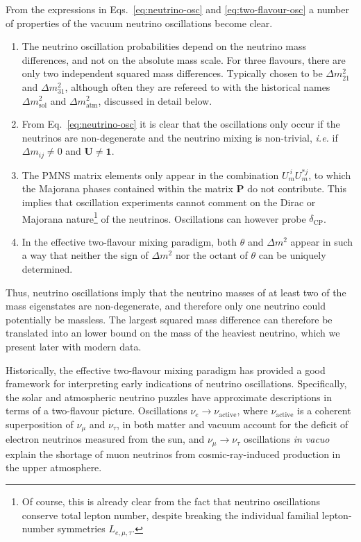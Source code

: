 From the expressions in Eqs.~\eqref{eq:neutrino-osc} and
\eqref{eq:two-flavour-osc} a number of properties of the vacuum neutrino
oscillations become clear.
\begin{enumerate}
  \item The neutrino oscillation probabilities depend on the neutrino mass
    differences, and not on the absolute mass scale. For three flavours, there
    are only two independent squared mass differences. Typically chosen to be
    $\Delta m_{21}^{2}$ and $\Delta m_{31}^{2}$, although often they are
    refereed to with the historical names $\Delta m_{\text{sol}}^{2}$ and
    $\Delta m_{\text{atm}}^{2}$, discussed in detail below.
  \item From Eq.~\eqref{eq:neutrino-osc} it is clear that the oscillations only
    occur if the neutrinos are non-degenerate and the neutrino mixing is
    non-trivial, \textit{i.e.} if $\Delta m_{ij} \neq 0$ and
    $\mathbf{U} \neq \mathbf{1}$.
  \item The PMNS matrix elements only appear in the combination
    $U_{m}^{\ i} U_{m}^{* j}$, to which the Majorana phases contained within the
    matrix $\mathbf{P}$ do not contribute. This implies that oscillation
    experiments cannot comment on the Dirac or Majorana nature\footnote{Of
    course, this is already clear from the fact that neutrino oscillations
    conserve total lepton number, despite breaking the individual familial
    lepton-number symmetries $L_{e, \mu, \tau}$.} of the neutrinos. Oscillations
    can however probe $\delta_{\text{CP}}$.
  \item In the effective two-flavour mixing paradigm, both $\theta$ and
    $\Delta m^{2}$ appear in such a way that neither the sign of $\Delta m^{2}$
    nor the octant of $\theta$ can be uniquely determined.
  \end{enumerate}
  Thus, neutrino oscillations imply that the neutrino masses of at least two of
  the mass eigenstates are non-degenerate, and therefore only one neutrino could
  potentially be massless. The largest squared mass difference can therefore be
  translated into an lower bound on the mass of the heaviest neutrino, which we
  present later with modern data.

  Historically, the effective two-flavour mixing paradigm has provided a good
  framework for interpreting early indications of neutrino oscillations.
  Specifically, the solar and atmospheric neutrino puzzles have approximate
  descriptions in terms of a two-flavour picture. Oscillations
  $\nu_{e} \to \nu_{\text{active}}$, where $\nu_{\text{active}}$ is a coherent
  superposition of $\nu_{\mu}$ and $\nu_{\tau}$, in both matter and vacuum
  account for the deficit of electron neutrinos measured from the sun, and
  $\nu_{\mu} \to \nu_{\tau}$ oscillations \textit{in vacuo} explain the shortage
  of muon neutrinos from cosmic-ray-induced production in the upper atmosphere.

